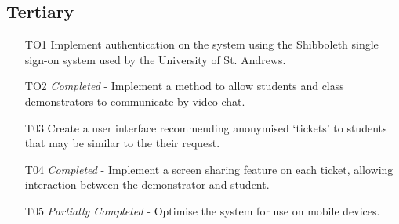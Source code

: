 \subsection{Tertiary}
\begin{itemize}
    \item [TO1] Implement authentication on the system using the Shibboleth single sign-on system used by the University of St. Andrews.
    \item [TO2] \textit{Completed} - Implement a method to allow students and class demonstrators to communicate by video chat. 
    \item [T03] Create a user interface recommending anonymised `tickets' to students that may be similar to the their request.
    \item [T04] \textit{Completed} - Implement a screen sharing feature on each ticket, allowing interaction between the demonstrator and student.
    \item [T05] \textit{Partially Completed} - Optimise the system for use on mobile devices. 
\end{itemize}




 
